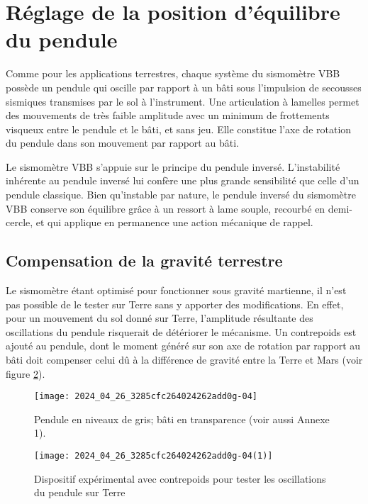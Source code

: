 
\section{Réglage de la position d'équilibre du pendule \label{ccmp2023_sec_02}}
Comme pour les applications terrestres, chaque système du sismomètre VBB possède un pendule qui oscille par rapport à un bâti sous l'impulsion de secousses sismiques transmises par le sol à l'instrument. Une articulation à lamelles permet des mouvements de très faible amplitude avec un minimum de frottements visqueux entre le pendule et le bâti, et sans jeu. Elle constitue l'axe de rotation du pendule dans son mouvement par rapport au bâti.

Le sismomètre VBB s'appuie sur le principe du pendule inversé. L'instabilité inhérente au pendule inversé lui confère une plus grande sensibilité que celle d'un pendule classique. Bien qu'instable par nature, le pendule inversé du sismomètre VBB conserve son équilibre grâce à un ressort à lame souple, recourbé en demi-cercle, et qui applique en permanence une action mécanique de rappel.

\subsection{Compensation de la gravité terrestre \label{ccmp2023_sec_02_01}}
Le sismomètre étant optimisé pour fonctionner sous gravité martienne, il n'est pas possible de le tester sur Terre sans y apporter des modifications. En effet, pour un mouvement du sol donné sur Terre, l'amplitude résultante des oscillations du pendule risquerait de détériorer le mécanisme. Un contrepoids est ajouté au pendule, dont le moment généré sur son axe de rotation par rapport au bâti doit compenser celui dû à la différence de gravité entre la Terre et Mars (voir figure \ref{ccmp2023_fig_03b}).



\begin{figure*}[h!]
    \centering
    \begin{subfigure}[t]{0.45\textwidth}
        \centering
        \texttt{[image: 2024\_04\_26\_3285cfc264024262add0g-04]}
        \caption{\label{ccmp2023_fig_03a} Pendule en niveaux de gris; bâti en transparence (voir aussi Annexe 1).}
    \end{subfigure}%
    \hfill
    \begin{subfigure}[t]{0.45\textwidth}
        \centering
        \texttt{[image: 2024\_04\_26\_3285cfc264024262add0g-04(1)]}
        \caption{\label{ccmp2023_fig_03b} Dispositif expérimental avec contrepoids pour tester les oscillations du pendule sur Terre}
    \end{subfigure}
    \caption{}
\end{figure*}


